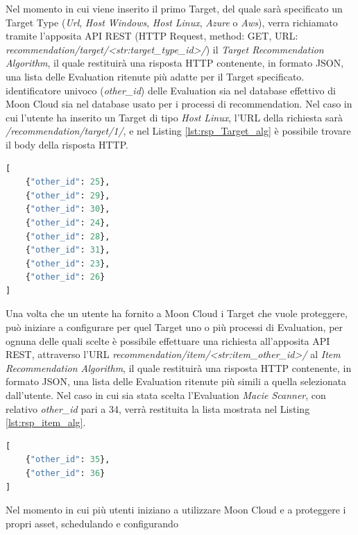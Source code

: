 Nel momento in cui viene inserito il primo Target, del quale sarà specificato un Target Type (\textit{Url}, \textit{Host Windows}, 
\textit{Host Linux}, \textit{Azure} o \textit{Aws}), verra richiamato tramite l'apposita API REST (HTTP Request, method: GET, URL: 
\textit{recommendation/target/<str:target\_type\_id>/}) il \textit{Target Recommendation Algorithm}, il quale restituirà una 
risposta HTTP contenente, in formato JSON, una lista delle Evaluation ritenute più adatte per il Target specificato. 
identificatore univoco (\textit{other\_id}) delle Evaluation sia nel database effettivo di Moon Cloud sia nel database usato 
per i processi di recommendation. 
Nel caso in cui l'utente ha inserito un Target di tipo \textit{Host Linux}, l'URL della richiesta sarà 
\textit{/recommendation/target/1/}, e nel Listing \ref{lst:rsp_Target_alg} è possibile trovare il body della risposta HTTP.
\lstset{style=python_code_style}
\begin{lstlisting}[language=Python, label=lst:rsp_Target_alg, caption={Esempio del body della risposta HTTP alla chiamata del 
    \textit{Target Recommendation Algorithm}}]
[
    {"other_id": 25},
    {"other_id": 29},
    {"other_id": 30},
    {"other_id": 24},
    {"other_id": 28},
    {"other_id": 31},
    {"other_id": 23},
    {"other_id": 26}
]
\end{lstlisting}
Una volta che un utente ha fornito a Moon Cloud i Target che vuole proteggere, può iniziare a configurare per quel Target uno 
o più processi di Evaluation, per ognuna delle quali scelte è possibile effettuare una richiesta all'apposita API REST, 
attraverso l'URL \textit{recommendation/item/<str:item\_other\_id>/} al \textit{Item Recommendation Algorithm}, il quale 
restituirà una risposta HTTP contenente, in formato JSON, una lista delle Evaluation ritenute più simili a quella selezionata 
dall'utente. Nel caso in cui sia stata scelta l'Evaluation \textit{Macie Scanner}, con relativo \textit{other\_id} pari a 34, 
verrà restituita la lista mostrata nel Listing \ref{lst:rsp_item_alg}.
\begin{lstlisting}[language=Python, label=lst:rsp_item_alg, caption={Esempio del body della risposta HTTP alla chiamata del 
    \textit{Item Recommendation Algorithm}}]
[
    {"other_id": 35},
    {"other_id": 36}
]
\end{lstlisting}
Nel momento in cui più utenti iniziano a utilizzare Moon Cloud e a proteggere i propri asset, schedulando e configurando 
